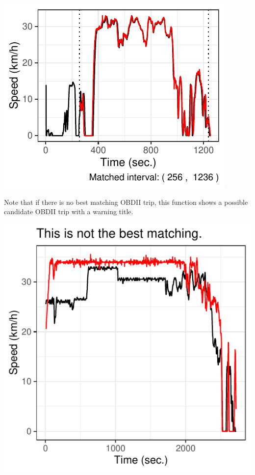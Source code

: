 \documentclass[letterpaper,9pt,twocolumn,twoside,]{pinp}
\begin{document}
\begin{center}\includegraphics{report_issaclee_files/figure-latex/sampleresult-1} \end{center}

Note that if there is no best matching OBDII trip, this function shows a
possible candidate OBDII trip with a warning title.

\begin{Shaded}
\begin{Highlighting}[]
\StringTok{ }\NormalTok{mobile_data[[}\NormalTok{]]}

\StringTok{ }

\end{Highlighting}
\end{Shaded}

\begin{center}\includegraphics{report_issaclee_files/figure-latex/unnamed-chunk-10-1} \end{center}





\end{document}
